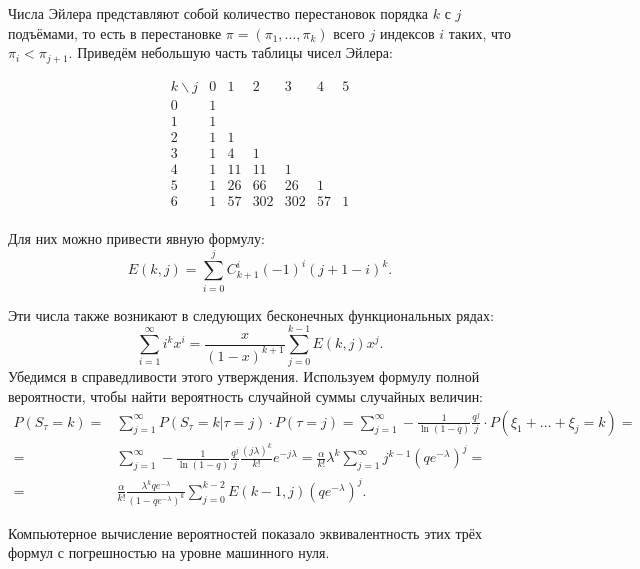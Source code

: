 \documentclass[12pt, specialist, subf, substylefile = spbu_report.rtx]{disser}
\begin{document}
	Числа Эйлера представляют собой количество перестановок порядка $k$ с $j$ подъёмами, то есть в перестановке $\pi = (\pi _1, \dots, \pi _k)$ всего $j$ индексов $i$ таких, что $\pi _i < \pi _{j + 1}$. Приведём небольшую часть таблицы чисел Эйлера:
	\begin{center}
		\[
		\begin{array}{c|cccccccc}
			k \backslash j & 0 & 1 & 2 & 3 & 4 & 5\\ \hline
			0 & 1 &  &  &  &  & \\
			1 & 1 &  &  &  &  & \\
			2 & 1 & 1 &  &  &  & \\
			3 & 1 & 4 & 1 &  &  & \\
			4 & 1 & 11 & 11 & 1 &  & \\
			5 & 1 & 26 & 66 & 26 & 1 & \\
			6 & 1 & 57 & 302 & 302 &57 &1 \\
		\end{array}
		\]
	\end{center}

	Для них можно привести явную формулу:
	\[
		E(k, j) = \sum \limits ^j _{i = 0} C ^i _{k + 1} (-1) ^i (j + 1 - i) ^k.
	\]

	Эти числа также возникают в следующих бесконечных функциональных рядах:
	\[
		\sum \limits ^\infty _{i = 1} i ^k x ^i = \frac {x} {(1 - x) ^{k + 1}} \sum \limits ^{k - 1} _{j = 0} E(k, j) x ^j.
	\]
	Убедимся в справедливости этого утверждения. Используем формулу полной вероятности, чтобы найти вероятность случайной суммы случайных величин:
	\[
		\begin{aligned}
			P(S _\tau = k) =& \sum \limits ^{\infty} _{j = 1} P(\left.S _\tau = k\right| \tau = j) \cdot P(\tau = j) = \sum \limits ^{\infty} _{j = 1} - \frac 1 {\ln(1 - q)} \frac {q ^j} j \cdot P(\xi _1 + \dots + \xi _j = k) =\\
			=& \sum \limits ^{\infty} _{j = 1} - \frac 1 {\ln(1 - q)} \frac {q ^j} j \frac {(j \lambda) ^k} {k !} e ^{-j \lambda} = \frac \alpha {k !} \lambda ^k \sum \limits ^{\infty} _{j = 1} j ^{k - 1} \left(q e ^{-\lambda}\right) ^j =\\
			=& \frac \alpha {k !} \frac {\lambda ^k q e ^{-\lambda}} {\left(1 - q e ^{-\lambda}\right) ^k} \sum \limits ^{k - 2} _{j = 0} E(k - 1, j) \left(q e ^{-\lambda}\right) ^j.
		\end{aligned}
	\]
	
	
	Компьютерное вычисление вероятностей показало эквивалентность этих трёх формул с погрешностью на уровне машинного нуля.
	
\end{document}
